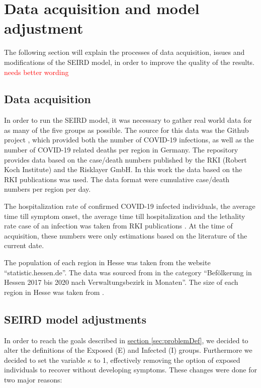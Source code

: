 \section{Data acquisition and model adjustment}
The following section will explain the processes of data acquisition, issues and modifications of the SEIRD model,
in order to improve the quality of the results. \textcolor{red}{needs better wording}

\subsection{Data acquisition}
\label{sec:datacoll}
In order to run the SEIRD model, it was necessary to gather real world data for as many of the five groups as possible.
The source for this data was the Github project \cite{Gehrcke}, which provided both the number of COVID-19 infections,
as well as the number of COVID-19 related deaths per region in Germany. The repository provides data based on the case/death
numbers published by the RKI (Robert Koch Institute) and the Risklayer GmbH. In this work the data based on the RKI publications
was used. The data format were cumulative case/death numbers per region per day.\newline

\par
The hospitalization rate of confirmed COVID-19 infected individuals, the average time till symptom onset, the average time till
hospitalization and the lethality rate case of an infection was taken from RKI publications \cite{RKIcov}. At the time of acquisition, these
numbers were only estimations based on the literature of the current date.\newline

\par
The population of each region in Hesse was taken from the website ``statistic.hessen.de''. The data was sourced from \cite{HessePop}
in the category ``Bef\"olkerung in Hessen 2017 bis 2020 nach Verwaltungsbezirk in Monaten''. The size of each region in Hesse
was taken from \cite{HesseSize}.

\subsection{SEIRD model adjustments}
\label{sec:SEIRDredef}
In order to reach the goals described in \hyperref[sec:problemDef]{section \ref*{sec:problemDef}}, we decided to alter
the definitions of the Exposed (E) and Infected (I) groups. Furthermore we decided to set the variable
$\kappa$ to 1, effectively removing the option of exposed individuals to recover without developing symptoms. These
changes were done for two major reasons:\newline

